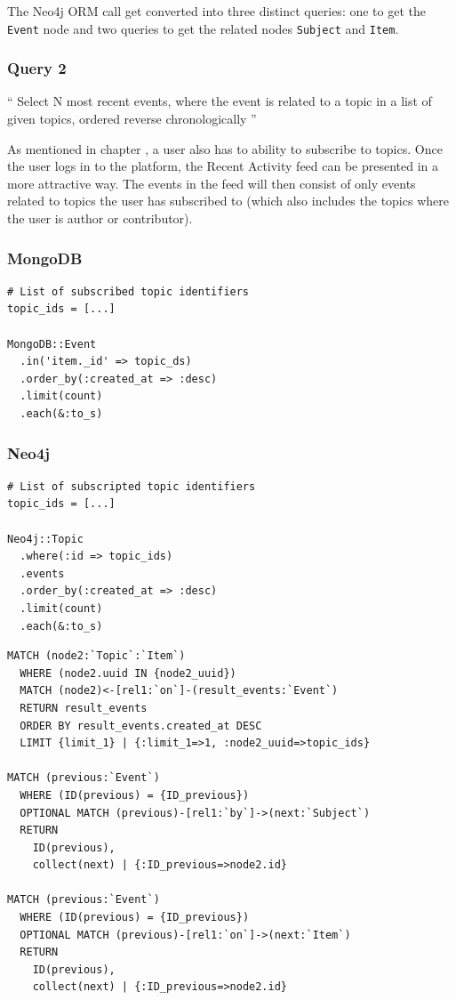 The Neo4j ORM call get converted into three distinct queries: one to get the \texttt{Event} node and two queries to get the related nodes \texttt{Subject} and \texttt{Item}.

\subsubsection{Query 2}
\label{subsubsec:query-2}

``
Select N most recent events, where the event is related to a topic in a list of given topics, ordered reverse chronologically
''

As mentioned in chapter , a user also has to ability to subscribe to topics.
Once the user logs in to the platform, the Recent Activity feed can be presented in a more attractive way.
The events in the feed will then consist of only events related to topics the user has subscribed to (which also includes the topics where the user is author or contributor).

\subsubsection*{MongoDB}

\begin{verbatim}
# List of subscribed topic identifiers
topic_ids = [...]

MongoDB::Event
  .in('item._id' => topic_ds)
  .order_by(:created_at => :desc)
  .limit(count)
  .each(&:to_s)
\end{verbatim}

\subsubsection*{Neo4j}

\begin{verbatim}
# List of subscripted topic identifiers
topic_ids = [...]

Neo4j::Topic
  .where(:id => topic_ids)
  .events
  .order_by(:created_at => :desc)
  .limit(count)
  .each(&:to_s)
\end{verbatim}

\begin{verbatim}
MATCH (node2:`Topic`:`Item`)
  WHERE (node2.uuid IN {node2_uuid})
  MATCH (node2)<-[rel1:`on`]-(result_events:`Event`)
  RETURN result_events
  ORDER BY result_events.created_at DESC
  LIMIT {limit_1} | {:limit_1=>1, :node2_uuid=>topic_ids}

MATCH (previous:`Event`)
  WHERE (ID(previous) = {ID_previous})
  OPTIONAL MATCH (previous)-[rel1:`by`]->(next:`Subject`)
  RETURN
    ID(previous),
    collect(next) | {:ID_previous=>node2.id}

MATCH (previous:`Event`)
  WHERE (ID(previous) = {ID_previous})
  OPTIONAL MATCH (previous)-[rel1:`on`]->(next:`Item`)
  RETURN
    ID(previous),
    collect(next) | {:ID_previous=>node2.id}
\end{verbatim}

